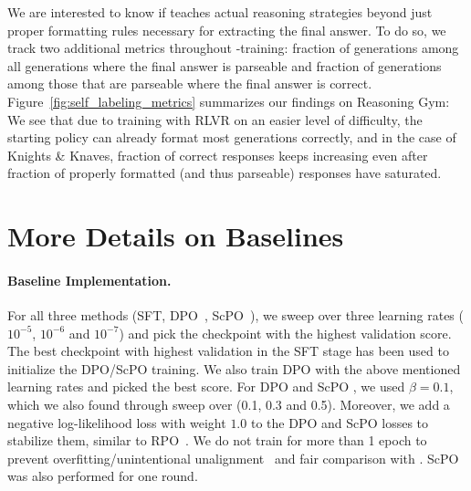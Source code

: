 We are interested to know if \algo{} teaches actual reasoning strategies beyond just proper formatting rules necessary for extracting the final answer. To do so, we track two additional metrics throughout \algo{}-training: fraction of generations among all generations where the final answer is parseable and fraction of generations among those that are parseable where the final answer is correct. Figure~\ref{fig:self_labeling_metrics} summarizes our findings on Reasoning Gym: We see that due to training with RLVR on an easier level of difficulty, the starting policy can already format most generations correctly, and in the case of Knights \& Knaves, fraction of correct responses keeps increasing even after fraction of properly formatted (and thus parseable) responses have saturated. 

\pagebreak


\section{More Details on Baselines} \label{app:baseline_details}

\paragraph{Baseline Implementation. }
For all three methods (SFT, DPO~\citep{rafailov2024directpreferenceoptimizationlanguage}, ScPO~\citep{prasad2024selfconsistencypreferenceoptimization}), we sweep over three learning rates ($10^{-5}$, $10^{-6}$ and $10^{-7}$) and pick the checkpoint with the highest validation score. The best checkpoint with highest validation in the SFT stage has been used to initialize the DPO/ScPO training. We also train DPO with the above mentioned learning rates and picked the best score. For DPO and ScPO \citep{prasad2024selfconsistencypreferenceoptimization}, we used $\beta = 0.1$, which we also found through sweep over (0.1, 0.3 and 0.5). Moreover, we add a negative log-likelihood loss with weight $1.0$ to the DPO and ScPO losses to stabilize them, similar to RPO~\citep{pang2024iterativereasoningpreferenceoptimization}. We do not train for more than 1 epoch to prevent overfitting/unintentional unalignment~\citep{tajwar2024preferencefinetuningllmsleverage,razin2025unintentionalunalignmentlikelihooddisplacement} and fair comparison with \algo{}. ScPO was also performed for one round.

